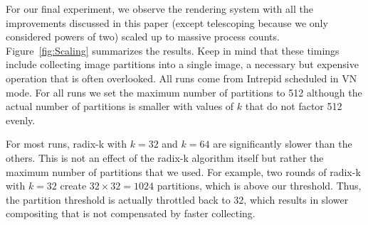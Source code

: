 \documentclass{acm_proc_article-sp}
\begin{document}
For our final experiment, we observe the rendering system with all the
improvements discussed in this paper (except telescoping because we only
considered powers of two) scaled up to massive process counts.
Figure~\ref{fig:Scaling} summarizes the results.  Keep in mind that these
timings include collecting image partitions into a single image, a
necessary but expensive operation that is often overlooked.  All runs come
from Intrepid scheduled in VN mode.  For all runs we set the maximum number
of partitions to 512 although the actual number of partitions is smaller
with values of $k$ that do not factor 512 evenly.

For most runs, radix-k with $k=32$ and $k=64$ are significantly slower than
the others.  This is not an effect of the radix-k algorithm itself but
rather the maximum number of partitions that we used.  For example, two
rounds of radix-k with $k=32$ create $32 \times 32 = 1024$ partitions,
which is above our threshold.  Thus, the partition threshold is actually
throttled back to 32, which results in slower compositing that is not
compensated by faster collecting.
\end{document}
